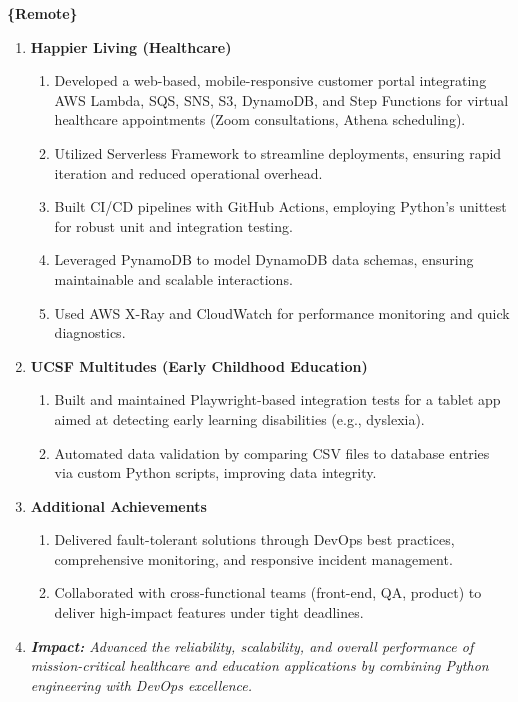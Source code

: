 \documentclass[oneside]{article}%
\begin{document}
\begin{enumerate}[]
		\textbf{\{Remote\}}
		\begin{enumerate}[]
			\item \textbf{Happier Living (Healthcare)}
				\begin{enumerate}[-]
					\item Developed a web-based, mobile-responsive customer portal integrating AWS Lambda, SQS, SNS, S3, DynamoDB, and Step Functions for virtual healthcare appointments (Zoom consultations, Athena scheduling).
					\item Utilized Serverless Framework to streamline deployments, ensuring rapid iteration and reduced operational overhead.
					\item Built CI/CD pipelines with GitHub Actions, employing Python’s unittest for robust unit and integration testing.
					\item Leveraged PynamoDB to model DynamoDB data schemas, ensuring maintainable and scalable interactions.
					\item Used AWS X-Ray and CloudWatch for performance monitoring and quick diagnostics.
				\end{enumerate}
			\item \textbf{UCSF Multitudes (Early Childhood Education)}
				\begin{enumerate}[-]
					\item Built and maintained Playwright-based integration tests for a tablet app aimed at detecting early learning disabilities (e.g., dyslexia).
					\item Automated data validation by comparing CSV files to database entries via custom Python scripts, improving data integrity.
				\end{enumerate}
			\item \textbf{Additional Achievements}
				\begin{enumerate}[-]
					\item Delivered fault-tolerant solutions through DevOps best practices, comprehensive monitoring, and responsive incident management.
					\item Collaborated with cross-functional teams (front-end, QA, product) to deliver high-impact features under tight deadlines.
				\end{enumerate}
			\item \textit{\textbf{Impact:} Advanced the reliability, scalability, and overall performance of mission-critical healthcare and education applications by combining Python engineering with DevOps excellence.}
		\end{enumerate}

\end{enumerate}
\end{document}

